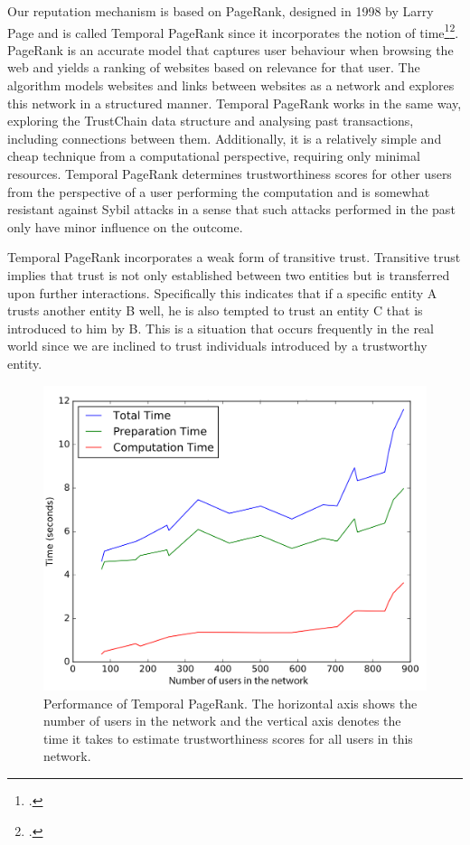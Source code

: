 \documentclass[USenglish]{article}
\begin{document}
Our reputation mechanism is based on PageRank, designed in 1998 by Larry Page and is called Temporal PageRank since it incorporates the notion of time\footcite{page1999pagerank}\footcite{otte2016sybil}.
PageRank is an accurate model that captures user behaviour when browsing the web and yields a ranking of websites based on relevance for that user.
The algorithm models websites and links between websites as a network and explores this network in a structured manner.
Temporal PageRank works in the same way, exploring the TrustChain data structure and analysing past transactions, including connections between them.
Additionally, it is a relatively simple and cheap technique from a computational perspective, requiring only minimal resources.
Temporal PageRank determines trustworthiness scores for other users from the perspective of a user performing the computation and is somewhat resistant against Sybil attacks in a sense that such attacks performed in the past only have minor influence on the outcome.

Temporal PageRank incorporates a weak form of transitive trust.
Transitive trust implies that trust is not only established between two entities but is transferred upon further interactions.
Specifically this indicates that if a specific entity A trusts another entity B well, he is also tempted to trust an entity C that is introduced to him by B.
This is a situation that occurs frequently in the real world since we are inclined to trust individuals introduced by a trustworthy entity.

\begin{figure}[t]
	\centering
	\includegraphics[width=0.6\columnwidth]{assets/pagerank_times}
	\caption{Performance of Temporal PageRank. The horizontal axis shows the number of users in the network and the vertical axis denotes the time it takes to estimate trustworthiness scores for all users in this network.}
	\label{fig:pagerank_performance}
\end{figure}
\end{document}
